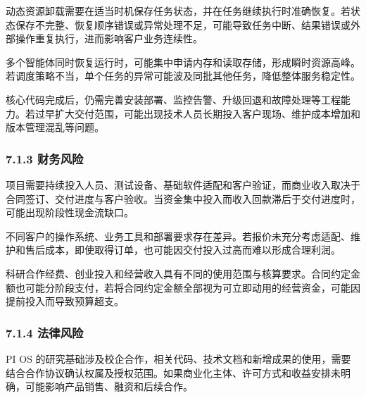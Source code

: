 
动态资源卸载需要在适当时机保存任务状态，并在任务继续执行时准确恢复。若状态保存不完整、恢复顺序错误或异常处理不足，可能导致任务中断、结果错误或外部操作重复执行，进而影响客户业务连续性。


多个智能体同时恢复运行时，可能集中申请内存和读取存储，形成瞬时资源高峰。若调度策略不当，单个任务的异常可能波及同批其他任务，降低整体服务稳定性。


核心代码完成后，仍需完善安装部署、监控告警、升级回退和故障处理等工程能力。若过早扩大交付范围，可能出现技术人员长期投入客户现场、维护成本增加和版本管理混乱等问题。

\subsubsection{7.1.3 财务风险}\label{ux8d22ux52a1ux98ceux9669}


项目需要持续投入人员、测试设备、基础软件适配和客户验证，而商业收入取决于合同签订、交付进度与客户验收。当资金集中投入而收入回款滞后于交付进度时，可能出现阶段性现金流缺口。


不同客户的操作系统、业务工具和部署要求存在差异。若报价未充分考虑适配、维护和售后成本，即使取得订单，也可能因交付投入过高而难以形成合理利润。


科研合作经费、创业投入和经营收入具有不同的使用范围与核算要求。合同约定金额也可能分阶段支付，若将合同约定金额全部视为可立即动用的经营资金，可能因提前投入而导致预算超支。

\subsubsection{7.1.4 法律风险}\label{ux6cd5ux5f8bux98ceux9669}


PI OS 的研究基础涉及校企合作，相关代码、技术文档和新增成果的使用，需要结合合作协议确认权属及授权范围。如果商业化主体、许可方式和收益安排未明确，可能影响产品销售、融资和后续合作。


